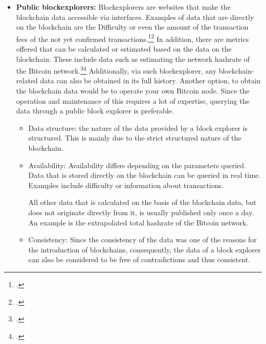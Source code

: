 \begin{itemize}
    \item \textbf{Public blockexplorers: }Blockexplorers are websites that make the blockchain data accessible via interfaces.
    Examples of data that are directly on the blockchain are the Difficulty or even the amount of the
    transaction fees of the not yet confirmed
    transactions.\footcite[Cf.][]{bitcoin2021getdifficulty}\footcite[Cf.][]{bitcoin2021getrawmempool} In addition, there are
    metrics offered that can be calculated or estimated based on the data on the blockchain. These include
    data such as estimating the network hashrate of the Bitcoin
    network.\footcite[Cf.][]{blockchain2021total}\footcite[Cf.][]{blockchain2021api} Additionally, via such
    blockexplorer, any blockchain-related data can also be obtained in its full history. Another option,
    to obtain the blockchain data would be to operate your own Bitcoin node. Since the operation and maintenance of this
    requires a lot of expertise, querying the data through a public block explorer is preferable.
    \begin{itemize}
        \item Data structure: the nature of the data provided by a block explorer is structured.
        This is mainly due to the strict structured nature of the blockchain.
        \item Availability: Availability differs depending on the parameters queried. Data that is stored directly on
        the blockchain can be queried in real time. Examples include difficulty or information
        about transactions.
        
        All other data that is calculated on the basis of the blockchain data, but does not originate directly from it, is
        usually published only once a day. An example is the extrapolated total hashrate of the Bitcoin network.
        \item Consistency: Since the consistency of the data was one of the reasons for the introduction of blockchains,
        consequently, the data of a block explorer can also be considered to be free of contradictions and thus consistent. 
    \end{itemize}


\end{itemize}
